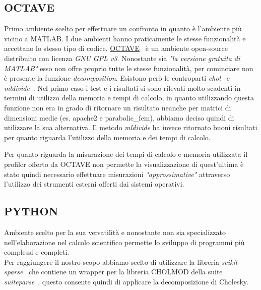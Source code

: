 \documentclass[a4paper,12pt,titlepage,oneside]{book}
\begin{document}
        \subsection{OCTAVE}
        \noindent Primo ambiente scelto per effettuare un confronto in quanto è l'ambiente più vicino a MATLAB. I due ambienti hanno praticamente le stesse funzionalità e accettano lo stesso tipo di codice. \href{https://www.gnu.org/software/octave/}{OCTAVE}~\cite{octave} è un ambiente open-source distribuito con licenza \textit{GNU GPL v3}.
        Nonostante sia \textit{"la versione gratuita di MATLAB"} esso non offre proprio tutte le stesse funzionalità, per cominciare non è presente la funzione \textit{decomposition}. Esistono però le controparti \textit{chol}~\cite{choloctave} e \textit{mldivide}~\cite{mldivideoctave}. Nel primo caso i test e i risultati si sono rilevati molto scadenti in termini di utilizzo della memoria e tempi di calcolo, in quanto utilizzando questa funzione non era in grado di ritornare un risultato neanche per matrici di dimensioni medie (es. apache2 e parabolic\_fem), abbiamo deciso quindi di utilizzare la sua alternativa. Il metodo \textit{mldivide} ha invece ritornato buoni risultati per quanto riguarda l'utilizzo della memoria e dei tempi di calcolo.\\[0.5cm]
        
        
        
        \vspace{0.5cm}
        
        \noindent Per quanto riguarda la misurazione dei tempi di calcolo e memoria  utilizzata il profiler offerto da OCTAVE non permette la visualizzazione di quest'ultima è stato quindi necessario effettuare misurazioni \textit{"approssimative"} attraverso l'utilizzo dei strumenti esterni offerti dai sistemi operativi.
        
        \newpage
        \subsection{PYTHON}
        \noindent Ambiente scelto per la sua versatilità e nonostante non sia specializzato nell'elaborazione nel calcolo scientifico permette lo sviluppo di programmi più complessi e completi.\\
        Per raggiungere il nostro scopo abbiamo scelto di utilizzare la libreria \textit{scikit-sparse}~\cite{scikit-sparse} che contiene un wrapper per la libreria CHOLMOD della suite \textit{suiteparse}~\cite{suitesparse}, questo consente quindi di applicare la decomposizione di Cholesky.
        
\end{document}
